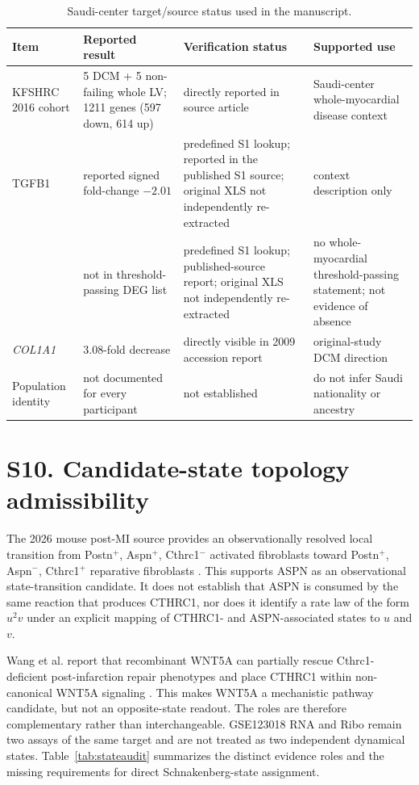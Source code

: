 \documentclass[11pt]{article}
\begin{document}
\begin{table}[H]\centering\caption{Saudi-center target/source status used in the manuscript.}\label{tab:saudi}\small
\begin{tabularx}{\linewidth}{p{2.2cm}p{2.8cm}YY}
\toprule \textbf{Item} & \textbf{Reported result} & \textbf{Verification status} & \textbf{Supported use}\\\midrule
KFSHRC 2016 cohort & 5 DCM + 5 non-failing whole LV; 1211 genes (597 down, 614 up) & directly reported in source article & Saudi-center whole-myocardial disease context\\
TGFB1 & reported signed fold-change $-2.01$ & predefined S1 lookup; reported in the published S1 source; original XLS not independently re-extracted & context description only\\
\cthrc{} & not in threshold-passing DEG list & predefined S1 lookup; published-source report; original XLS not independently re-extracted & no whole-myocardial threshold-passing statement; not evidence of absence\\
\textit{COL1A1} & 3.08-fold decrease & directly visible in 2009 accession report & original-study DCM direction\\
Population identity & not documented for every participant & not established & do not infer Saudi nationality or ancestry\\\bottomrule
\end{tabularx}\end{table}

\section*{S10. Candidate-state topology admissibility}
The 2026 mouse post-MI source provides an observationally resolved local transition from Postn$^+$, Aspn$^+$, Cthrc1$^-$ activated fibroblasts toward Postn$^+$, Aspn$^-$, Cthrc1$^+$ reparative fibroblasts \cite{Hernandez2026}. This supports ASPN as an observational state-transition candidate. It does not establish that ASPN is consumed by the same reaction that produces CTHRC1, nor does it identify a rate law of the form $u^2v$ under an explicit mapping of CTHRC1- and ASPN-associated states to $u$ and $v$.

Wang et al. report that recombinant WNT5A can partially rescue Cthrc1-deficient post-infarction repair phenotypes and place CTHRC1 within non-canonical WNT5A signaling \cite{Wang2023}. This makes WNT5A a mechanistic pathway candidate, but not an opposite-state readout. The roles are therefore complementary rather than interchangeable. GSE123018 RNA and Ribo remain two assays of the same target and are not treated as two independent dynamical states. Table~\ref{tab:stateaudit} summarizes the distinct evidence roles and the missing requirements for direct Schnakenberg-state assignment.
\end{document}
